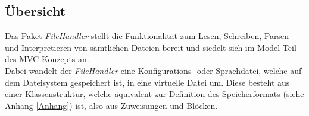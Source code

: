 \documentclass[parskip=full]{scrartcl}
\begin{document}
\subsection{Übersicht}
Das Paket \textit{FileHandler} stellt die Funktionalität zum Lesen, Schreiben, Parsen und Interpretieren von sämtlichen Dateien bereit und siedelt sich im Model-Teil des MVC-Konzepts an. \\
Dabei wandelt der \textit{FileHandler} eine Konfigurations- oder Sprachdatei, welche auf dem Dateisystem gespeichert ist, in eine virtuelle Datei um. 
Diese besteht aus einer Klassenstruktur, welche äquivalent zur Definition des Speicherformats (siehe Anhang \ref{Anhang}) ist, also aus Zuweisungen und Blöcken. \\
\end{document}
